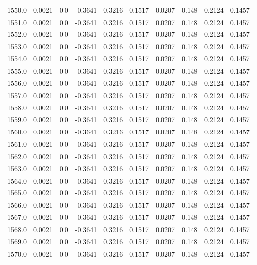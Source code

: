 \begin{longtable}{lrrrrrrrrr}
1550.0 & 0.0021 & 0.0 & -0.3641 & 0.3216 & 0.1517 & 0.0207 & 0.148 & 0.2124 & 0.1457 \\
1551.0 & 0.0021 & 0.0 & -0.3641 & 0.3216 & 0.1517 & 0.0207 & 0.148 & 0.2124 & 0.1457 \\
1552.0 & 0.0021 & 0.0 & -0.3641 & 0.3216 & 0.1517 & 0.0207 & 0.148 & 0.2124 & 0.1457 \\
1553.0 & 0.0021 & 0.0 & -0.3641 & 0.3216 & 0.1517 & 0.0207 & 0.148 & 0.2124 & 0.1457 \\
1554.0 & 0.0021 & 0.0 & -0.3641 & 0.3216 & 0.1517 & 0.0207 & 0.148 & 0.2124 & 0.1457 \\
1555.0 & 0.0021 & 0.0 & -0.3641 & 0.3216 & 0.1517 & 0.0207 & 0.148 & 0.2124 & 0.1457 \\
1556.0 & 0.0021 & 0.0 & -0.3641 & 0.3216 & 0.1517 & 0.0207 & 0.148 & 0.2124 & 0.1457 \\
1557.0 & 0.0021 & 0.0 & -0.3641 & 0.3216 & 0.1517 & 0.0207 & 0.148 & 0.2124 & 0.1457 \\
1558.0 & 0.0021 & 0.0 & -0.3641 & 0.3216 & 0.1517 & 0.0207 & 0.148 & 0.2124 & 0.1457 \\
1559.0 & 0.0021 & 0.0 & -0.3641 & 0.3216 & 0.1517 & 0.0207 & 0.148 & 0.2124 & 0.1457 \\
1560.0 & 0.0021 & 0.0 & -0.3641 & 0.3216 & 0.1517 & 0.0207 & 0.148 & 0.2124 & 0.1457 \\
1561.0 & 0.0021 & 0.0 & -0.3641 & 0.3216 & 0.1517 & 0.0207 & 0.148 & 0.2124 & 0.1457 \\
1562.0 & 0.0021 & 0.0 & -0.3641 & 0.3216 & 0.1517 & 0.0207 & 0.148 & 0.2124 & 0.1457 \\
1563.0 & 0.0021 & 0.0 & -0.3641 & 0.3216 & 0.1517 & 0.0207 & 0.148 & 0.2124 & 0.1457 \\
1564.0 & 0.0021 & 0.0 & -0.3641 & 0.3216 & 0.1517 & 0.0207 & 0.148 & 0.2124 & 0.1457 \\
1565.0 & 0.0021 & 0.0 & -0.3641 & 0.3216 & 0.1517 & 0.0207 & 0.148 & 0.2124 & 0.1457 \\
1566.0 & 0.0021 & 0.0 & -0.3641 & 0.3216 & 0.1517 & 0.0207 & 0.148 & 0.2124 & 0.1457 \\
1567.0 & 0.0021 & 0.0 & -0.3641 & 0.3216 & 0.1517 & 0.0207 & 0.148 & 0.2124 & 0.1457 \\
1568.0 & 0.0021 & 0.0 & -0.3641 & 0.3216 & 0.1517 & 0.0207 & 0.148 & 0.2124 & 0.1457 \\
1569.0 & 0.0021 & 0.0 & -0.3641 & 0.3216 & 0.1517 & 0.0207 & 0.148 & 0.2124 & 0.1457 \\
1570.0 & 0.0021 & 0.0 & -0.3641 & 0.3216 & 0.1517 & 0.0207 & 0.148 & 0.2124 & 0.1457 \\

\end{longtable}
